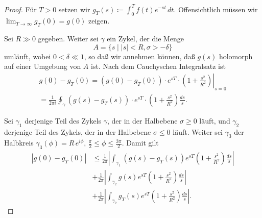 \documentclass[a4paper,twoside,openright]{report}
\theoremstyle{definition}
\theoremstyle{remark}
\begin{document}
\begin{proof}
  Für $T > 0$ setzen wir $g_T(s) \coloneqq \int_0^T f(t) e^{-st} \, dt$.
  Offensichtlich müssen wir $\lim_{T \to \infty} g_T(0) = g(0)$ zeigen.
  
  Sei $R \gg 0$ gegeben. Weiter sei $\gamma$ ein Zykel, der die Menge
  \[
    A = \{s \mid |s| < R, \sigma > - \delta\}
  \]
  umläuft, wobei $0 < \delta \ll 1$, so
  daß wir annehmen können, daß $g(s)$ holomorph auf einer Umgebung von $A$ ist. 
  Nach dem Cauchyschen Integralsatz ist
  \[
    \begin{split}
      g(0) - g_T(0)
      = (g(0) - g_T(0)) \cdot \left. e^{sT} \cdot \left(1 + \frac {s^2}{R^2}\right)\right|_{s = 0}
      \\
      = \frac 1 {2 \pi i} \oint_\gamma (g(s) - g_T(s)) \cdot e^{sT} \cdot \left(1 + \frac {s^2}{R^2}\right) \frac {ds}{s}.
    \end{split}
  \] 
   
  Sei $\gamma_1$ derjenige Teil des Zykels $\gamma$, der in der Halbebene $\sigma \ge 0$
  läuft, und $\gamma_2$ derjenige Teil des Zykels, der in der Halbebene $\sigma \le 0$
  läuft. Weiter sei $\gamma_3$ der Halbkreis $\gamma_3(\phi) = R \, e^{i \phi}$, $\frac \pi 2 \leq \phi \leq \frac {3 \pi} 2$. 
  Damit gilt
  \[
    \begin{split}
      |g(0) - g_T(0)| & \leq \frac 1 {2\pi} \left|
        \int_{\gamma_1} (g(s) - g_T(s)) e^{sT} \left(1 + \frac {s^2}{R^2}\right) \frac {ds}{s}\right|
        \\
        & + \frac 1 {2\pi} \left|
        \int_{\gamma_2} g(s) e^{sT} \left(1 + \frac {s^2}{R^2}\right) \frac {ds}{s}\right|
        \\
        & + \frac 1 {2\pi} \left|
        \int_{\gamma_2} g_T(s) e^{sT} \left(1 + \frac {s^2}{R^2}\right) \frac {ds}{s}\right|.
    \end{split}
  \]
  

\end{proof}
\end{document}
